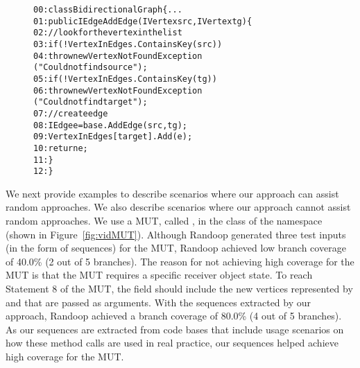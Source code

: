 \begin{figure}[t]
\begin{CodeOut}
\begin{alltt}
00:class BidirectionalGraph \{ ...
01:\hspace*{0.1in}public IEdge AddEdge(IVertex src, IVertex tg) \{
02:\hspace*{0.2in}// look for the vertex in the list
03:\hspace*{0.2in}if (!VertexInEdges.ContainsKey(src))
04:\hspace*{0.3in}throw new VertexNotFoundException 
\hspace*{0.5in}("Could not find source");
05:\hspace*{0.2in}if (!VertexInEdges.ContainsKey(tg))
06:\hspace*{0.3in}throw new VertexNotFoundException 
\hspace*{0.5in}("Could not find target");
07:\hspace*{0.2in}// create edge
08:\hspace*{0.2in}IEdge e = base.AddEdge(src, tg);
09:\hspace*{0.2in}VertexInEdges[target].Add(e);
10:\hspace*{0.2in}return e;
11:\hspace*{0.1in}\}
12:\}
\end{alltt}
\end{CodeOut} \vspace*{-5ex}
 \vspace*{-5ex}
\end{figure}

We next provide examples to describe scenarios where our approach can assist random approaches. We also describe scenarios where our approach cannot assist random approaches. We use a MUT, called , in the  class of the  namespace (shown in Figure~\ref{fig:vidMUT}). Although Randoop generated three test inputs (in the form of sequences) for the  MUT, Randoop achieved low branch coverage of 40.0\% (2 out of 5 branches). The reason for not achieving high coverage for the  MUT is that the  MUT requires a specific receiver object state. To reach Statement 8 of the MUT, the  field should include the new vertices represented by  and  that are passed as arguments. With the sequences extracted by our approach, Randoop achieved a branch coverage of 80.0\% (4 out of 5 branches). As our sequences are extracted from code bases that include usage scenarios on how these method calls are used in real practice, our sequences helped achieve high coverage for the  MUT. 

